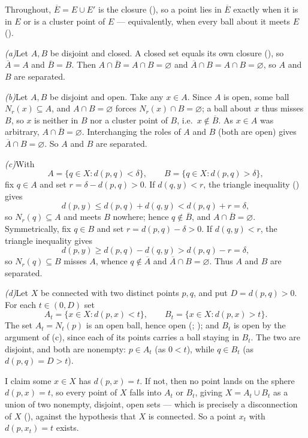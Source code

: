 \documentclass[main.tex]{subfiles}
\begin{document}
\begin{SolutionBlue}
Throughout, $\overline{E}=E\cup E'$ is the closure (), so a point lies in $\overline{E}$
exactly when it is in $E$ or is a cluster point of $E$ --- equivalently, when every ball about it meets
$E$ ().

\smallskip\noindent\textit{(a)}\enspace Let $A,B$ be disjoint and closed. A closed set equals its own
closure (), so $\overline{A}=A$ and $\overline{B}=B$. Then
$A\cap\overline{B}=A\cap B=\varnothing$ and $\overline{A}\cap B=A\cap B=\varnothing$, so $A$ and $B$ are
separated.

\smallskip\noindent\textit{(b)}\enspace Let $A,B$ be disjoint and open. Take any $x\in A$. Since $A$ is
open, some ball $N_{r}(x)\subseteq A$, and $A\cap B=\varnothing$ forces $N_{r}(x)\cap B=\varnothing$; a
ball about $x$ thus misses $B$, so $x$ is neither in $B$ nor a cluster point of $B$, i.e.\
$x\notin\overline{B}$. As $x\in A$ was arbitrary, $A\cap\overline{B}=\varnothing$. Interchanging the
roles of $A$ and $B$ (both are open) gives $\overline{A}\cap B=\varnothing$. So $A$ and $B$ are
separated.

\smallskip\noindent\textit{(c)}\enspace With
\[
A=\{q\in X:d(p,q)<\delta\},\qquad B=\{q\in X:d(p,q)>\delta\},
\]
fix $q\in A$ and set $r=\delta-d(p,q)>0$. If $d(q,y)<r$, the triangle inequality () gives
\[
d(p,y)\le d(p,q)+d(q,y)<d(p,q)+r=\delta,
\]
so $N_{r}(q)\subseteq A$ and meets $B$ nowhere; hence $q\notin\overline{B}$, and
$A\cap\overline{B}=\varnothing$. Symmetrically, fix $q\in B$ and set $r=d(p,q)-\delta>0$. If
$d(q,y)<r$, the triangle inequality gives
\[
d(p,y)\ge d(p,q)-d(q,y)>d(p,q)-r=\delta,
\]
so $N_{r}(q)\subseteq B$ misses $A$, whence $q\notin\overline{A}$ and $\overline{A}\cap B=\varnothing$.
Thus $A$ and $B$ are separated.

\smallskip\noindent\textit{(d)}\enspace Let $X$ be connected with two distinct points $p,q$, and put
$D=d(p,q)>0$. For each $t\in(0,D)$ set
\[
A_{t}=\{x\in X:d(p,x)<t\},\qquad B_{t}=\{x\in X:d(p,x)>t\}.
\]
The set $A_{t}=N_{t}(p)$ is an open ball, hence open (; \factref{balls-open}{open balls
are open}); and $B_{t}$ is open by the argument of (c), since each of its points carries a ball staying
in $B_{t}$. The two are disjoint, and both are nonempty: $p\in A_{t}$ (as $0<t$), while $q\in B_{t}$
(as $d(p,q)=D>t$).

I claim some $x\in X$ has $d(p,x)=t$. If not, then no point lands on the sphere $d(p,x)=t$, so every
point of $X$ falls into $A_{t}$ or $B_{t}$, giving $X=A_{t}\cup B_{t}$ as a union of two nonempty,
disjoint, open sets --- which is precisely a disconnection of $X$ (\xrefL{4.4.2}), against the
hypothesis that $X$ is connected. So a point $x_{t}$ with $d(p,x_{t})=t$ exists.


\end{SolutionBlue}
\end{document}
